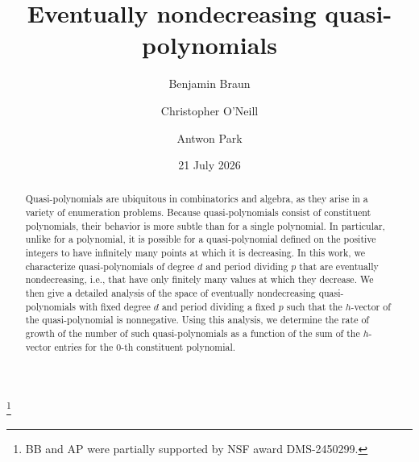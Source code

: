 \documentclass[12pt]{amsart}
\theoremstyle{definition}
\numberwithin{equation}{section}
\renewcommand\>{\rangle}
\newcommand\<{\langle}
\newcommand\0{\mathbf{0}}
\begin{document}


\mbox{}
\title{Eventually nondecreasing quasi-polynomials}

\author[B.~Braun]{Benjamin Braun}
\address{Mathematics Department\\University of Kentucky\\Lexington, KY 40506}

\author[C.~O'Neill]{Christopher O'Neill}
\address{Mathematics Department\\San Diego State University\\San Diego, CA 92182}

\author[A.~Park]{Antwon Park}
\address{Mathematics Department\\University of Kentucky\\Lexington, KY 40506}

\date{21 July 2026}

\thanks{BB and AP were partially supported by NSF award DMS-2450299.}

\begin{abstract}
Quasi-polynomials are ubiquitous in combinatorics and algebra, as they arise in a variety of enumeration problems.
Because quasi-polynomials consist of constituent polynomials, their behavior is more subtle than for a single polynomial.
In particular, unlike for a polynomial, it is possible for a quasi-polynomial defined on the positive integers to have infinitely many points at which it is decreasing.
In this work, we characterize quasi-polynomials of degree $d$ and period dividing $p$ that are eventually nondecreasing, i.e., that have only finitely many values at which they decrease.
We then give a detailed analysis of the space of eventually nondecreasing quasi-polynomials with fixed degree $d$ and period dividing a fixed $p$ such that the $h$-vector of the quasi-polynomial is nonnegative.
Using this analysis, we determine the rate of growth of the number of such quasi-polynomials as a function of the sum of the $h$-vector entries for the $0$-th constituent polynomial.
\end{abstract}

\maketitle
\end{document}
